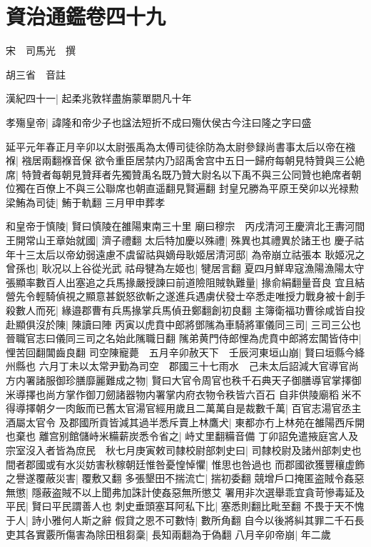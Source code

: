\chapter{資治通鑑卷四十九}
宋　司馬光　撰

胡三省　音註

漢紀四十一|{
	起柔兆敦䍧盡旃蒙單閼凡十年}


孝殤皇帝|{
	諱隆和帝少子也諡法短折不成曰殤㐲侯古今注曰隆之字曰盛}


延平元年春正月辛卯以太尉張禹為太傅司徒徐防為太尉參録尚書事太后以帝在襁褓|{
	襁居兩翻褓音保}
欲令重臣居禁内乃詔禹舍宫中五日一歸府每朝見特贊與三公絶席|{
	特贊者每朝見贊拜者先獨贊禹名既乃贊大尉名以下禹不與三公同贊也絶席者朝位獨在百僚上不與三公聯席也朝直遥翻見賢遍翻}
封皇兄勝為平原王癸卯以光禄勲梁鮪為司徒|{
	鮪于軌翻}
三月甲申葬孝

和皇帝于慎陵|{
	賢曰慎陵在雒陽東南三十里}
廟曰穆宗　丙戌清河王慶濟北王夀河間王開常山王章始就國|{
	濟子禮翻}
太后特加慶以殊禮|{
	殊異也其禮異於諸王也}
慶子祜年十三太后以帝幼弱遠慮不虞留祜與嫡母耿姬居清河邸|{
	為帝崩立祜張本}
耿姬况之曾孫也|{
	耿况以上谷從光武}
祜母犍為左姬也|{
	犍居言翻}
夏四月鮮卑寇漁陽漁陽太守張顯率數百人出塞追之兵馬掾嚴授諫曰前道險阻賊執難量|{
	掾俞絹翻量音良}
宜且結營先令輕騎偵視之顯意甚鋭怒欲斬之遂進兵遇虜伏發士卒悉走唯授力戰身被十創手殺數人而死|{
	緣邉郡曹有兵馬掾掌兵馬偵丑鄭翻創初良翻}
主簿衛福功曹徐咸皆自投赴顯俱沒於陳|{
	陳讀曰陣}
丙寅以虎賁中郎將鄧隲為車騎將軍儀同三司|{
	三司三公也晉職官志曰儀同三司之名始此隲職日翻}
隲弟黄門侍郎悝為虎賁中郎將宏閶皆侍中|{
	悝苦回翻閶齒良翻}
司空陳寵薨　五月辛卯赦天下　壬辰河東垣山崩|{
	賢曰垣縣今絳州縣也}
六月丁未以太常尹勤為司空　郡國三十七雨水　己未太后詔減大官導官尚方内署諸服御珍膳靡麗難成之物|{
	賢曰大官令周官也秩千石典天子御膳導官掌擇御米導擇也尚方掌作御刀劒諸器物内署掌内府衣物令秩皆六百石}
自非供陵廟稻米不得導擇朝夕一肉飯而已舊太官湯官經用歲且二萬萬自是裁數千萬|{
	百官志湯官丞主酒屬太官令}
及郡國所貢皆減其過半悉斥賣上林鷹犬|{
	東都亦冇上林苑在雒陽西斥開也棄也}
離宫别館儲峙米糒薪炭悉令省之|{
	峙丈里翻糒音備}
丁卯詔免遣掖庭宮人及宗室沒入者皆為庶民　秋七月庚寅敕司隸校尉部刺史曰|{
	司隸校尉及諸州部刺史也}
間者郡國或有水災妨害秋稼朝廷惟咎憂惶悼懼|{
	惟思也咎過也}
而郡國欲獲豐穰虚飾之譽遂覆蔽災害|{
	覆敷又翻}
多張墾田不揣流亡|{
	揣初委翻}
競增戶口掩匿盗賊令姦惡無懲|{
	隱蔽盗賊不以上聞弗加誅計使姦惡無所懲艾}
署用非次選舉乖宜貪苛慘毒延及平民|{
	賢曰平民謂善人也}
刺史垂頭塞耳阿私下比|{
	塞悉則翻比毗至翻}
不畏于天不愧于人|{
	詩小雅何人斯之辭}
假貸之恩不可數恃|{
	數所角翻}
自今以後將糾其罪二千石長吏其各實覈所傷害為除田租芻稾|{
	長知兩翻為于偽翻}
八月辛卯帝崩|{
	年二歲}
